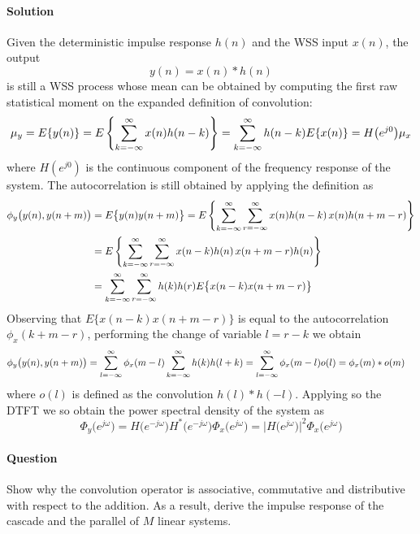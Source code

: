 	\paragraph{Solution} Given the deterministic impulse response $h(n)$ and the WSS input $x(n)$, the output 
	\[ y(n) = x(n) * h(n) \]
	is still a WSS process whose mean can be obtained by computing the first raw statistical moment on the expanded definition of convolution:
	\[ \mu_y = E\{y(n)\} = E\left\{ \sum_{k=-\infty}^\infty x(n)h(n-k) \right\} = \sum_{k=-\infty}^\infty h(n-k) E\{ x(n) \} = H\big(e^{j0}\big) \mu_x \]
	where $H(e^{j0})$ is the continuous component of the frequency response of the system. The autocorrelation is still obtained by applying the definition as
	\begin{align*}
		\phi_y\big(y(n),y(n+m)\big) & = E\big\{ y(n) y(n+m)\big\} = E\left\{ \sum_{k=-\infty}^\infty \sum_{r=-\infty}^\infty x(n)h(n-k)\,x(n)h(n+m-r) \right\} \\
		& = E\left\{ \sum_{k=-\infty}^\infty \sum_{r=-\infty}^\infty x(n-k)h(n)\,x(n+m-r)h(n) \right\} \\
		& = \sum_{k=-\infty}^\infty \sum_{r=-\infty}^\infty h(k) h(r) E\big\{ x(n-k)  x(n+m-r) \big\}
	\end{align*}
	Observing that $E\big\{ x(n-k)  x(n+m-r) \big\}$ is equal to the autocorrelation $\phi_x(k+m-r)$, performing the change of variable $l = r - k$ we obtain
	\begin{align*}
		\phi_y\big(y(n),y(n+m)\big) & = \sum_{l=-\infty}^\infty \phi_x(m-l) \sum_{k=-\infty}^\infty h(k) h(l+k) = \sum_{l=-\infty}^\infty \phi_x(m-l) o(l) = \phi_x(m) * o(m)
	\end{align*}
	where $o(l)$ is defined as the convolution $h(l)*h(-l)$. Applying so the DTFT we so obtain the power spectral density of the system as
	\[ \Phi_y\big(e^{j\omega}\big) = H\big(e^{-j\omega}\big) H^*\big(e^{-j\omega}\big) \Phi_x\big(e^{j\omega}\big) = \big|  H\big(e^{j\omega}\big)\big|^2 \Phi_x\big(e^{j\omega}\big) \]
\newquestion
	\paragraph{Question} Show why the convolution operator is associative, commutative and distributive with respect to the addition. As a result, derive the impulse response of the cascade and the parallel of $M$ linear systems.
	
